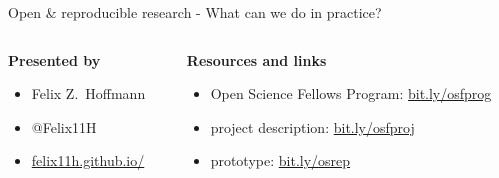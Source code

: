\begin{frame}
  \vspace{0.8cm}
  
  \begin{center} 
    \Large Open \& reproducible research - What can we do in practice?
  \end{center}
  
  \vspace{1.0cm}

  \small
  \begin{columns}[t]
    \begin{column}{0.4\textwidth}        
      \textbf{Presented by}
      
      \begin{itemize}[leftmargin=0.6cm]
        \itemsep0pt
      \item[] Felix Z.~Hoffmann
        \item[] @Felix11H
        \item[] \href{http://felix11h.github.io/}{felix11h.github.io/}
      \end{itemize}

      \vspace{0.38cm}
      
    \end{column}
    \begin{column}{0.59\textwidth}
      \textbf{Resources and links}
      \vspace{-0.1cm}
       
      \begin{itemize}[leftmargin=0.6cm]
        \itemsep4pt
        \item[] Open Science Fellows Program: %
          \href{http://bit.ly/osfprog}{bit.ly/osfprog}
        \item[] project description: %
          \href{http://bit.ly/osfproj}{bit.ly/osfproj}
        \item[] prototype: \href{http://bit.ly/osrep}{bit.ly/osrep}
      \end{itemize}




\end{column}
\end{columns}
\end{frame}
